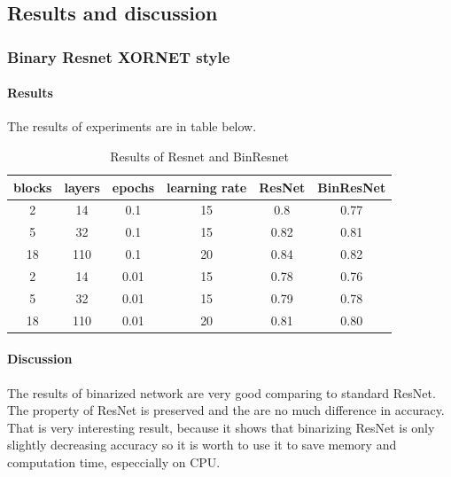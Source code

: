 \documentclass[licencjacka]{pracamgr}
\begin{document}
		\subsection{Results and discussion}
			\subsubsection{Binary Resnet XORNET style}
		        \paragraph{Results} 
		        
		        The results of experiments are in table below.
		        \begin{table}[H]
		                        \caption{Results of Resnet and BinResnet}
		                        \centering
		                        \begin{tabular}{c c c c c c}
		                        \hline\hline
		                        blocks & layers & epochs & learning rate & ResNet & BinResNet  \\ [0.5ex]
		                        \hline
		                                2 & 14  & 0.1   & 15 & 0.8 & 0.77 \\
		                                5 & 32  & 0.1   & 15 & 0.82 & 0.81 \\
		                                18      & 110 & 0.1     & 20 & 0.84 & 0.82\\
		                        \hline
		                                2 & 14  & 0.01  & 15 & 0.78 & 0.76 \\
		                                5 & 32  & 0.01  & 15 & 0.79 & 0.78 \\
		                                18 & 110 & 0.01 & 20 & 0.81 & 0.80 \\
		                        \hline
		                        \end{tabular}
		                        \label{table:nonlin}
		                \end{table}

		        \paragraph{Discussion} 

		        The results of binarized network are very good comparing to standard ResNet. The property of ResNet is preserved and the are no much difference in accuracy. That is very interesting result, because it shows that binarizing ResNet is only slightly decreasing accuracy so it is worth to use it to save memory and computation time, especcially on CPU.
\end{document}
